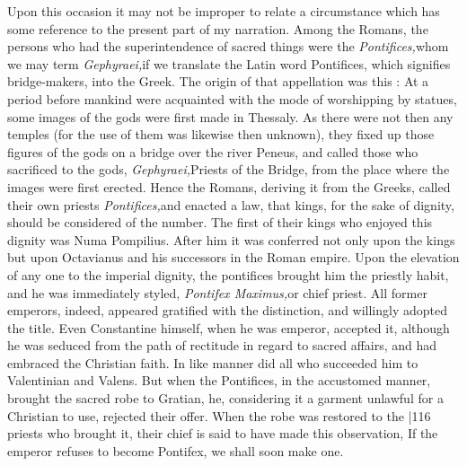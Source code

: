 Upon this occasion it may not be improper to relate a circumstance which has some reference to the present part of my narration. Among the Romans, the persons who had the superintendence of sacred things were the \emph{Pontifices,}whom we may term \emph{Gephyraei,}if we translate the Latin word Pontifices, which signifies bridge-makers, into the Greek. The origin of that appellation
was this : At a period before mankind were acquainted with the mode of worshipping by statues, some images of the gods were first made in Thessaly. As there were not then any temples (for the use of them was likewise then unknown), they fixed up those figures of the gods on a bridge over the river Peneus, and called those who sacrificed to the gods, \emph{Gephyraei,}Priests of the Bridge, from the place where the images were first erected. Hence the Romans, deriving it from the Greeks, called their own priests \emph{Pontifices,}and enacted a law, that kings, for the sake of dignity, should be considered of the number. The first of their kings who enjoyed this dignity was Numa Pompilius. After him it was conferred not only upon the kings but upon Octavianus and his successors in the Roman empire. Upon the elevation of any one to the imperial dignity, the pontifices brought him the priestly habit, and he was immediately styled, \emph{Pontifex Maximus,}or chief priest. All former emperors, indeed, appeared gratified
with the distinction, and willingly adopted the title. Even Constantine himself, when he was emperor, accepted it, although he was seduced from the path of rectitude in regard to sacred affairs, and had embraced the Christian faith. In like manner did all who succeeded him to Valentinian and Valens. But when the Pontifices, in the accustomed manner, brought the sacred robe to Gratian, he, considering it a garment unlawful for a Christian to use, rejected their offer. When the robe was restored to the
|116
priests who brought it, their chief is said to have made this observation, If the emperor refuses to become Pontifex, we shall soon make one.

